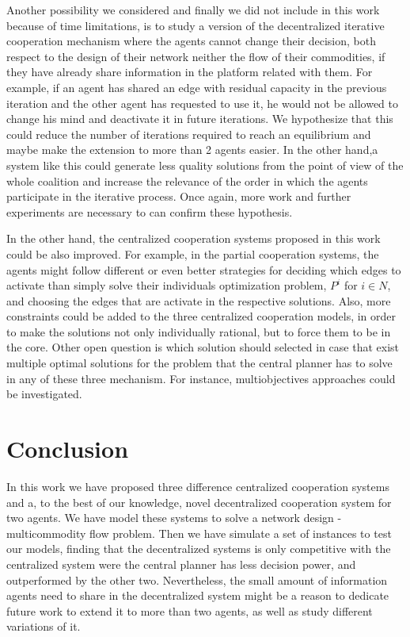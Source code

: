 \documentclass[authoryear]{elsarticle}
\begin{document}
Another possibility we considered and finally we did not include in this work because of time limitations, is to study a version of the 
decentralized iterative cooperation mechanism where the agents cannot change their decision, both respect to the design of their network neither the flow of their commodities, if they have already share information in the platform related with them. For example, if an agent has shared an edge with residual capacity in the previous iteration and the other agent has requested to use it, he would not be allowed to change his mind and deactivate it in future iterations. We hypothesize that this could reduce the number of iterations required  to reach an equilibrium and maybe make the extension to more than 2 agents easier. In the other hand,a system like this could generate less quality solutions from the point of view of the whole coalition and increase the relevance of the order in which the agents participate in the iterative process. Once again, more work and further experiments are necessary to can confirm these hypothesis.

In the other hand, the centralized cooperation systems proposed in this work could be also improved. For example, in the partial cooperation systems, the agents might follow different or even better strategies for deciding which edges to activate than simply solve their individuals optimization problem, $P^i$ for $i\in N$, and choosing the edges that are activate in the respective solutions. Also, more constraints could be added to the three centralized cooperation models, in order to make the solutions not only individually rational, but to force them to be in the core. Other open question is which solution should selected in case that exist multiple optimal solutions for the problem that the central planner has to solve in any of these three mechanism. For instance, multiobjectives approaches could be investigated.


\section{Conclusion} \label{seq:conclusion}

In this work we have proposed three difference centralized cooperation systems and a, to the best of our knowledge, novel decentralized cooperation system for two agents. We have model these systems to solve a network design - multicommodity flow problem. Then we have simulate a set of instances to test our models, finding that the decentralized systems is only competitive with the centralized system were the central planner has less decision power, and outperformed by the other two. Nevertheless, the small amount of information agents need to share in the decentralized system might be a reason to dedicate future work to extend it to more than two agents, as well as study different variations of it. 
\end{document}
